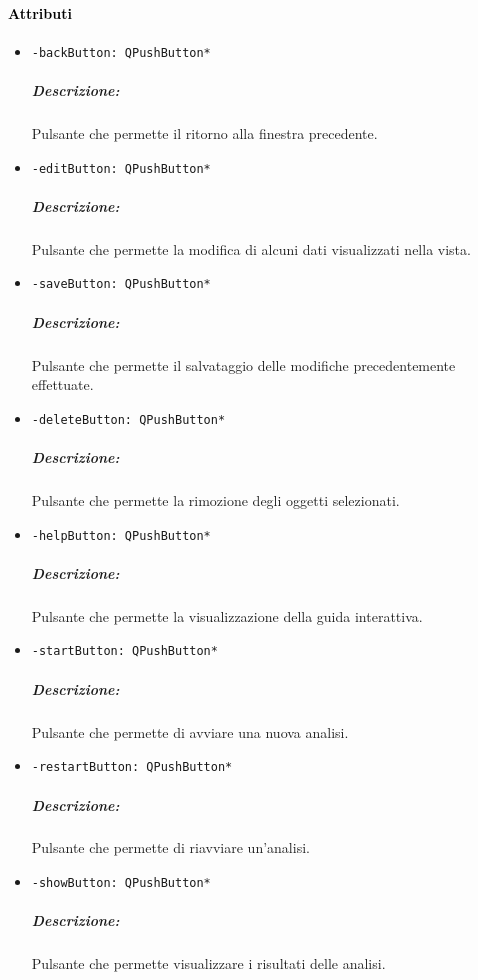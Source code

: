 \paragraph{\textcolor{black}{Attributi\\}}
\begin{itemize}
\item \color{teal}\verb!-backButton: QPushButton*!
\color{black}
\subparagraph{Descrizione: }Pulsante che permette il ritorno alla finestra precedente.

\item \color{teal}\verb!-editButton: QPushButton*!
\color{black}
\subparagraph{Descrizione: }Pulsante che permette la modifica di alcuni dati visualizzati nella vista.

\item \color{teal}\verb!-saveButton: QPushButton*!
\color{black}
\subparagraph{Descrizione: }Pulsante che permette il salvataggio delle modifiche precedentemente effettuate.

\item \color{teal}\verb!-deleteButton: QPushButton*!
\color{black}
\subparagraph{Descrizione: }Pulsante che permette la rimozione degli oggetti selezionati.

\item \color{teal}\verb!-helpButton: QPushButton*!
\color{black}
\subparagraph{Descrizione: }Pulsante che permette la visualizzazione della guida interattiva.

\item \color{teal}\verb!-startButton: QPushButton*!
\color{black}
\subparagraph{Descrizione: }Pulsante che permette di avviare una nuova analisi.

\item \color{teal}\verb!-restartButton: QPushButton*!
\color{black}
\subparagraph{Descrizione: }Pulsante che permette di riavviare un'analisi.

\item \color{teal}\verb!-showButton: QPushButton*!
\color{black}
\subparagraph{Descrizione: }Pulsante che permette visualizzare i risultati delle analisi.
\end{itemize}
